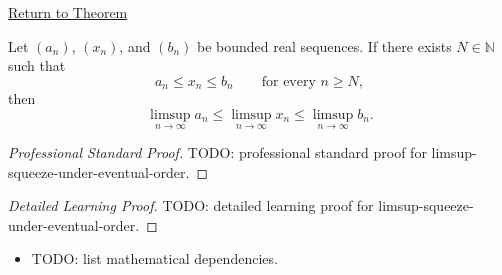 \newpage
{}
\label{prf:limsup-squeeze-under-eventual-order}

\begin{remark*}[Return]
\hyperref[thm:limsup-squeeze-under-eventual-order]{Return to Theorem}
\end{remark*}

\begin{theorem*}
Let $(a_n)$, $(x_n)$, and $(b_n)$ be bounded real sequences. If there
exists $N\in\mathbb{N}$ such that
\[
  a_n\le x_n\le b_n
  \qquad\text{for every }n\ge N,
\]
then
\[
  \limsup_{n\to\infty}a_n
  \le
  \limsup_{n\to\infty}x_n
  \le
  \limsup_{n\to\infty}b_n.
\]

\smallskip
\noindent
\end{theorem*}

\begin{proof}[Professional Standard Proof]
\LRAProofBodyStart
TODO: professional standard proof for limsup-squeeze-under-eventual-order.
\end{proof}

\begin{proof}[Detailed Learning Proof]
\LRAProofBodyStart
TODO: detailed learning proof for limsup-squeeze-under-eventual-order.
\end{proof}

\begin{remark*}
\end{remark*}

\begin{dependencies}
\begin{itemize}
  \item TODO: list mathematical dependencies.
\end{itemize}
\end{dependencies}

\clearpage
